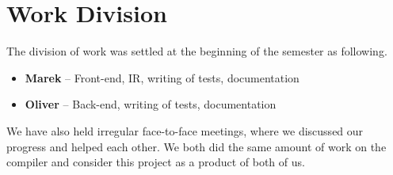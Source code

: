 \documentclass[12pt]{article}
\begin{document}
\section{Work Division}
The division of work was settled at the beginning of the semester as following.
\begin{itemize}
	\item \textbf{Marek} -- Front-end, IR, writing of tests, documentation
	\item \textbf{Oliver} -- Back-end, writing of tests, documentation
\end{itemize}

We have also held irregular face-to-face meetings, where we discussed our progress and helped each other.
We both did the same amount of work on the compiler and consider this project as a product of both of us.

\clearpage

\begin{flushleft}
	
\end{flushleft}
\end{document}
